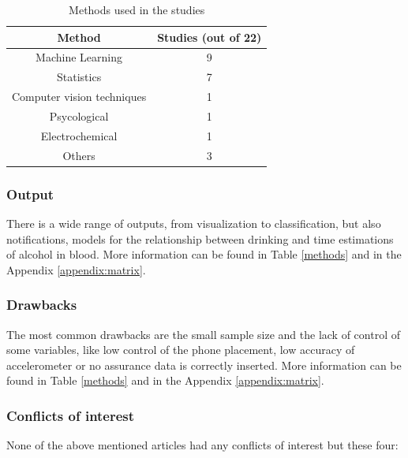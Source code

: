 \begin{table}[h!]
  \centering
 \begin{tabular}{||c | c ||}
 \hline
 Method & Studies (out of 22) \\ [0.5ex]
 \hline\hline
 Machine Learning & 9\\
 \hline
 Statistics & 7\\
 \hline
 Computer vision techniques & 1\\
 \hline
 Psycological &  1\\
 \hline
 Electrochemical &  1\\
 \hline
 Others & 3\\[0.5ex]
 \hline
\end{tabular}
\caption{Methods used in the studies}
\label{studymethods}
\end{table}

\subsubsection{Output}

There is a wide range of outputs, from visualization to classification, but also notifications, models for the relationship between drinking and time estimations of alcohol in blood. More information can be found in Table \ref{methods} and in the Appendix \ref{appendix:matrix}.

\subsubsection{Drawbacks}

The most common drawbacks are the small sample size and the lack of control of some variables, like low control of the phone placement, low accuracy of accelerometer or no assurance data is correctly inserted. More information can be found in Table \ref{methods} and in the Appendix \ref{appendix:matrix}.

\subsubsection{Conflicts of interest}

None of the above mentioned articles had any conflicts of interest but these four:

